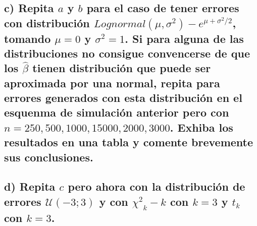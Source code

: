\documentclass[]{article}
\begin{document}
\hypertarget{c-repita-a-y-b-para-el-caso-de-tener-errores-con-distribucion-lognormalmusigma2-emusigma22-tomando-mu0-y-sigma21.-si-para-alguna-de-las-distribuciones-no-consigue-convencerse-de-que-los-hatbeta-tienen-distribucion-que-puede-ser-aproximada-por-una-normal-repita-para-errores-generados-con-esta-distribucion-en-el-esquenma-de-simulacion-anterior-pero-con-n25050010001500020003000.-exhiba-los-resultados-en-una-tabla-y-comente-brevemente-sus-conclusiones.}{%
\subsection{\texorpdfstring{c) Repita \(a\) y \(b\) para el caso de
tener errores con distribución
\(Lognormal(\mu,\sigma^2)-e^{\mu+{\sigma^2}/2}\), tomando \(\mu=0\) y
\(\sigma^2=1\). Si para alguna de las distribuciones no consigue
convencerse de que los \(\hat{\beta}\) tienen distribución que puede ser
aproximada por una normal, repita para errores generados con esta
distribución en el esquenma de simulación anterior pero con
\(n=250,500,1000,15000,2000,3000\). Exhiba los resultados en una tabla y
comente brevemente sus
conclusiones.}{c) Repita a y b para el caso de tener errores con distribución Lognormal(\textbackslash mu,\textbackslash sigma\^{}2)-e\^{}\{\textbackslash mu+\{\textbackslash sigma\^{}2\}/2\}, tomando \textbackslash mu=0 y \textbackslash sigma\^{}2=1. Si para alguna de las distribuciones no consigue convencerse de que los \textbackslash hat\{\textbackslash beta\} tienen distribución que puede ser aproximada por una normal, repita para errores generados con esta distribución en el esquenma de simulación anterior pero con n=250,500,1000,15000,2000,3000. Exhiba los resultados en una tabla y comente brevemente sus conclusiones.}}\label{c-repita-a-y-b-para-el-caso-de-tener-errores-con-distribucion-lognormalmusigma2-emusigma22-tomando-mu0-y-sigma21.-si-para-alguna-de-las-distribuciones-no-consigue-convencerse-de-que-los-hatbeta-tienen-distribucion-que-puede-ser-aproximada-por-una-normal-repita-para-errores-generados-con-esta-distribucion-en-el-esquenma-de-simulacion-anterior-pero-con-n25050010001500020003000.-exhiba-los-resultados-en-una-tabla-y-comente-brevemente-sus-conclusiones.}}

\hypertarget{d-repita-c-pero-ahora-con-la-distribucion-de-errores-mathcalu-33-y-con-chi2_k--k-con-k3-y-t_k-con-k3.}{%
\subsection{\texorpdfstring{d) Repita \(c\) pero ahora con la
distribución de errores \(\mathcal{U}(-3;3)\) y con \({\chi^2}_k -k\)
con \(k=3\) y \(t_k\) con
\(k=3\).}{d) Repita c pero ahora con la distribución de errores \textbackslash mathcal\{U\}(-3;3) y con \{\textbackslash chi\^{}2\}\_k -k con k=3 y t\_k con k=3.}}\label{d-repita-c-pero-ahora-con-la-distribucion-de-errores-mathcalu-33-y-con-chi2_k--k-con-k3-y-t_k-con-k3.}}
\end{document}
